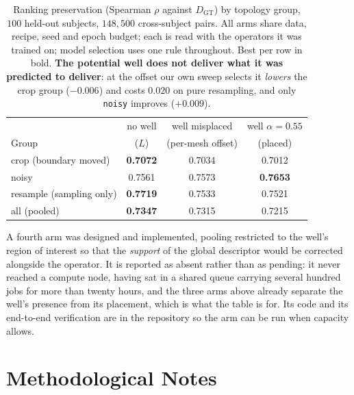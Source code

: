 \documentclass{article}
\begin{document}
\begin{table}[!ht]
\centering
\caption{Ranking preservation (Spearman $\rho$ against $D_{\mathrm{GT}}$) by topology group,
$100$ held-out subjects, $148{,}500$ cross-subject pairs. All arms share data, recipe, seed and
epoch budget; each is read with the operators it was trained on; model selection uses one rule
throughout. Best per row in bold. \textbf{The potential well does not deliver what it was
predicted to deliver}: at the offset our own sweep selects it \emph{lowers} the crop group
($-0.006$) and costs $0.020$ on pure resampling, and only \texttt{noisy} improves ($+0.009$).}
\label{tab:supp_potential}
\begin{tabular}{lccc}
\toprule
 & no well & well misplaced & well $\alpha{=}0.55$ \\
Group & ($L$) & (per-mesh offset) & (placed) \\
\midrule
crop (boundary moved)     & \textbf{0.7072} & 0.7034 & 0.7012 \\
noisy                     & 0.7561 & 0.7573 & \textbf{0.7653} \\
resample (sampling only)  & \textbf{0.7719} & 0.7533 & 0.7521 \\
\midrule
all (pooled)              & \textbf{0.7347} & 0.7315 & 0.7215 \\
\bottomrule
\end{tabular}

\vspace{0.4em}
\footnotesize A fourth arm was designed and implemented, pooling restricted to the well's region
of interest so that the \emph{support} of the global descriptor would be corrected alongside the
operator. It is reported as absent rather than as pending: it never reached a compute node,
having sat in a shared queue carrying several hundred jobs for more than twenty hours, and the
three arms above already separate the well's presence from its placement, which is what the
table is for. Its code and its end-to-end verification are in the repository so the arm can be
run when capacity allows.
\end{table}

\section{Methodological Notes}
\label{sec:supp_methodology}
\end{document}

